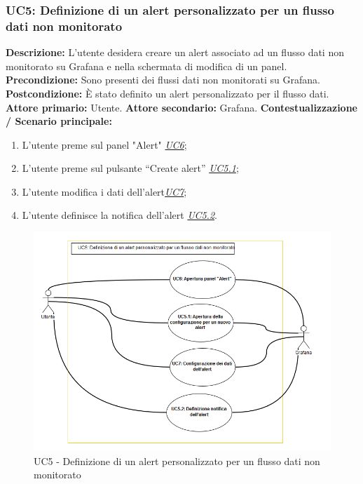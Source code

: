                    
                          
                \subsubsection{UC5: Definizione di un alert personalizzato per un flusso dati non monitorato}
                    \textbf{Descrizione:} L’utente desidera creare un alert associato ad un flusso dati non monitorato su Grafana e nella schermata di modifica di un panel.
                    \newline
                    \textbf{Precondizione:} Sono presenti dei flussi dati non monitorati su Grafana.
                    \newline
                    \textbf{Postcondizione:} È stato definito un alert personalizzato per il flusso dati.
                    \newline
                    \textbf{Attore primario:} Utente.
                    \newline
                    \textbf{Attore secondario:} Grafana.
                    \newline
                    \textbf{Contestualizzazione / Scenario principale:} \begin{enumerate}
                            \item L'utente preme sul panel "Alert" \underline{\textit{UC6}};
                            \item L’utente preme sul pulsante “Create alert” \underline{\textit{UC5.1}};
                            \item L'utente modifica i dati dell'alert\underline{\textit{UC7}};
                            \item L'utente definisce la notifica dell'alert \underline{\textit{UC5.2}}.
                        \end{enumerate}
                        
                        
                        \begin{figure}[!htbp]
                    	\centering
                    	\includegraphics[width=\textwidth]{UC5.png}
                    	\caption{UC5 - Definizione di un alert personalizzato per un flusso dati non monitorato}
                    	\label{uc5}
                    \end{figure} 
                    \clearpage
